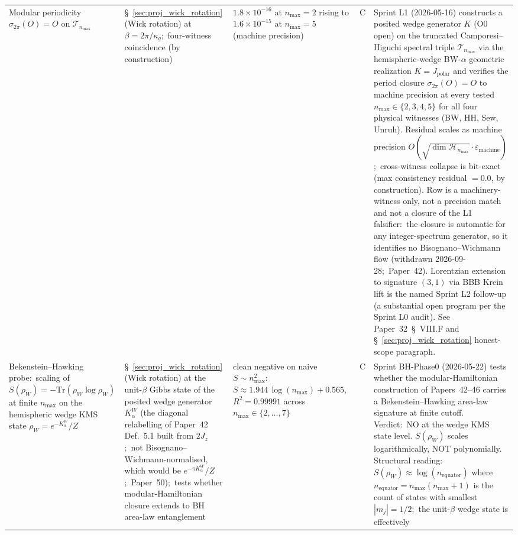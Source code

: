 \documentclass[11pt]{article}
\begin{document}
{\begin{longtable}{p{3.8cm} p{2.5cm} p{1.5cm} p{1.4cm} p{4.5cm}}
Modular periodicity $\sigma_{2\pi}(O) = O$ on $\mathcal{T}_{n_{\max}}$ &
\S~\ref{sec:proj_wick_rotation} (Wick rotation) at
$\beta = 2\pi / \kappa_g$;\ four-witness coincidence (by construction) &
$1.8\times 10^{-16}$ at $n_{\max}=2$ rising to
$1.6\times 10^{-15}$ at $n_{\max}=5$ (machine precision) & C &
Sprint L1 (2026-05-16) constructs a posited wedge generator $K$ (O0 open) on the truncated
Camporesi--Higuchi spectral triple $\mathcal{T}_{n_{\max}}$ via the
hemispheric-wedge BW-$\alpha$ geometric realization $K = J_{\mathrm{polar}}$
and verifies the period closure $\sigma_{2\pi}(O) = O$ to machine
precision at every tested $n_{\max} \in \{2, 3, 4, 5\}$ for all four physical
witnesses (BW, HH, Sew, Unruh).  Residual scales as machine precision
$O(\sqrt{\dim \mathcal{H}_{n_{\max}}} \cdot
\varepsilon_{\mathrm{machine}})$;\ cross-witness collapse is bit-exact
(max consistency residual $= 0.0$, by construction).  Row is a
machinery-witness only, not a precision match and not a closure of the
L1 falsifier:\ the closure is automatic for any integer-spectrum
generator, so it identifies no Bisognano--Wichmann flow (withdrawn
2026-09-28;\ Paper~42).
Lorentzian extension to signature $(3, 1)$ via BBB Krein lift is the
named Sprint L2 follow-up (a substantial open program per the
Sprint L0 audit).
See Paper~32~\S~VIII.F and \S~\ref{sec:proj_wick_rotation} honest-scope
paragraph. \\
Bekenstein--Hawking probe:\ scaling of
$S(\rho_W) = -\mathrm{Tr}(\rho_W \log \rho_W)$ at finite $n_{\max}$ on the
hemispheric wedge KMS state $\rho_W = e^{-K_\alpha^W}/Z$ &
\S~\ref{sec:proj_wick_rotation} (Wick rotation) at the unit-$\beta$
Gibbs state of the posited wedge generator $K_\alpha^W$ (the diagonal
relabelling of Paper~42 Def.~5.1 built from $2J_z$;\ not
Bisognano--Wichmann-normalised, which would be $e^{-\pi K_\alpha^W}/Z$;\
Paper~50);\ tests whether modular-Hamiltonian closure extends to
BH area-law entanglement &
clean negative on naive $S \sim n_{\max}^2$:\
$S \approx 1.944\, \log(n_{\max}) + 0.565$, $R^2 = 0.99991$ across
$n_{\max} \in \{2, \dots, 7\}$ & C &
Sprint BH-Phase0 (2026-05-22) tests whether the modular-Hamiltonian construction of
Papers~42--46 carries a Bekenstein--Hawking area-law signature at
finite cutoff.  Verdict:\ NO at the wedge KMS state level.  $S(\rho_W)$
scales logarithmically, NOT polynomially.  Structural reading:\
$S(\rho_W) \approx \log(n_{\mathrm{equator}})$ where
$n_{\mathrm{equator}} = n_{\max}(n_{\max}+1)$ is the count of states
with smallest $|m_j| = 1/2$;\ the unit-$\beta$ wedge state is effectively

\end{longtable}}
\end{document}
